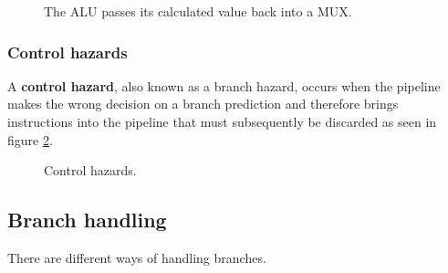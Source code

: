 \documentclass[titlepage, a4paper]{article}
\begin{document}
\begin{figure}[H]
	\centering
	\caption{The ALU passes its calculated value back into a MUX.}
	\label{fig:bypassing}
\end{figure}

\subsubsection{Control hazards}
A \textbf{control hazard}, also known as a branch hazard, occurs when the pipeline makes the wrong decision on a branch prediction and therefore brings instructions into the pipeline that must subsequently be discarded as seen in figure \ref{fig:control-hazard}.

\begin{figure}[H]
	\centering
	\caption{Control hazards.}
	\label{fig:control-hazard}
\end{figure}


\subsection{Branch handling}
There are different ways of handling branches. \\
\end{document}
